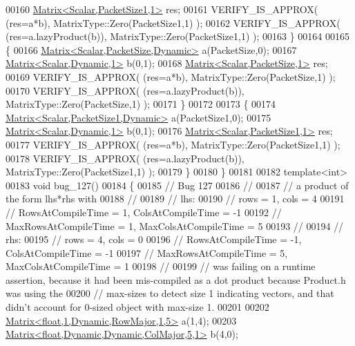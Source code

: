 \begin{DoxyCode}
00160     \hyperlink{group___core___module_class_eigen_1_1_matrix}{Matrix<Scalar,PacketSize1,1>} res;
00161     VERIFY\_IS\_APPROX( (res=a*b), MatrixType::Zero(PacketSize1,1) );
00162     VERIFY\_IS\_APPROX( (res=a.lazyProduct(b)), MatrixType::Zero(PacketSize1,1) );
00163   \}
00164   
00165   \{
00166     \hyperlink{group___core___module_class_eigen_1_1_matrix}{Matrix<Scalar,PacketSize,Dynamic>} a(PacketSize,0);
00167     \hyperlink{group___core___module}{Matrix<Scalar,Dynamic,1>} b(0,1);
00168     \hyperlink{group___core___module_class_eigen_1_1_matrix}{Matrix<Scalar,PacketSize,1>} res;
00169     VERIFY\_IS\_APPROX( (res=a*b), MatrixType::Zero(PacketSize,1) );
00170     VERIFY\_IS\_APPROX( (res=a.lazyProduct(b)), MatrixType::Zero(PacketSize,1) );
00171   \}
00172   
00173   \{
00174     \hyperlink{group___core___module_class_eigen_1_1_matrix}{Matrix<Scalar,PacketSize1,Dynamic>} a(PacketSize1,0);
00175     \hyperlink{group___core___module}{Matrix<Scalar,Dynamic,1>} b(0,1);
00176     \hyperlink{group___core___module_class_eigen_1_1_matrix}{Matrix<Scalar,PacketSize1,1>} res;
00177     VERIFY\_IS\_APPROX( (res=a*b), MatrixType::Zero(PacketSize1,1) );
00178     VERIFY\_IS\_APPROX( (res=a.lazyProduct(b)), MatrixType::Zero(PacketSize1,1) );
00179   \}
00180 \}
00181 
00182 \textcolor{keyword}{template}<\textcolor{keywordtype}{int}>
00183 \textcolor{keywordtype}{void} bug\_127()
00184 \{
00185   \textcolor{comment}{// Bug 127}
00186   \textcolor{comment}{//}
00187   \textcolor{comment}{// a product of the form lhs*rhs with}
00188   \textcolor{comment}{//}
00189   \textcolor{comment}{// lhs:}
00190   \textcolor{comment}{// rows = 1, cols = 4}
00191   \textcolor{comment}{// RowsAtCompileTime = 1, ColsAtCompileTime = -1}
00192   \textcolor{comment}{// MaxRowsAtCompileTime = 1, MaxColsAtCompileTime = 5}
00193   \textcolor{comment}{//}
00194   \textcolor{comment}{// rhs:}
00195   \textcolor{comment}{// rows = 4, cols = 0}
00196   \textcolor{comment}{// RowsAtCompileTime = -1, ColsAtCompileTime = -1}
00197   \textcolor{comment}{// MaxRowsAtCompileTime = 5, MaxColsAtCompileTime = 1}
00198   \textcolor{comment}{//}
00199   \textcolor{comment}{// was failing on a runtime assertion, because it had been mis-compiled as a dot product because
       Product.h was using the}
00200   \textcolor{comment}{// max-sizes to detect size 1 indicating vectors, and that didn't account for 0-sized object with
       max-size 1.}
00201 
00202   \hyperlink{group___core___module_class_eigen_1_1_matrix}{Matrix<float,1,Dynamic,RowMajor,1,5>} a(1,4);
00203   \hyperlink{group___core___module_class_eigen_1_1_matrix}{Matrix<float,Dynamic,Dynamic,ColMajor,5,1>} b(4,0);

\end{DoxyCode}

